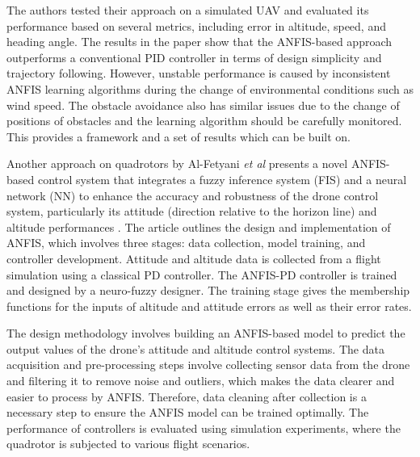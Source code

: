 The authors tested their approach on a simulated UAV and evaluated its performance based on several metrics, including error in altitude, speed, and heading angle. The results in the paper show that the ANFIS-based approach outperforms a conventional PID controller in terms of design simplicity and trajectory following. However, unstable performance is caused by inconsistent ANFIS learning algorithms during the change of environmental conditions such as wind speed. The obstacle avoidance also has similar issues due to the change of positions of obstacles and the learning algorithm should be carefully monitored. This provides a framework and a set of results which can be built on. 

Another approach on quadrotors by Al-Fetyani \textit{et al} presents a novel ANFIS-based control system that integrates a fuzzy inference system (FIS) and a neural network (NN) to enhance the accuracy and robustness of the drone control system, particularly its attitude (direction relative to the horizon line) and altitude performances \cite{boxi5}. The article outlines the design and implementation of ANFIS, which involves three stages: data collection, model training, and controller development. Attitude and altitude data is collected from a flight simulation using a classical PD controller. The ANFIS-PD controller is trained and designed by a neuro-fuzzy designer. The training stage gives the membership functions for the inputs of altitude and attitude errors as well as their error rates. 

The design methodology involves building an ANFIS-based model to predict the output values of the drone's attitude and altitude control systems. The data acquisition and pre-processing steps involve collecting sensor data from the drone and filtering it to remove noise and outliers, which makes the data clearer and easier to process by ANFIS. Therefore, data cleaning after collection is a necessary step to ensure the ANFIS model can be trained optimally. The performance of controllers is evaluated using simulation experiments, where the quadrotor is subjected to various flight scenarios. 

